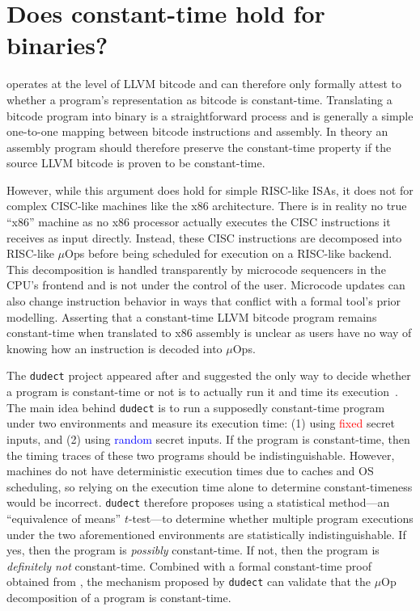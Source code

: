 \section{Does constant-time hold for binaries?}\label{sec:discussion}

\ctVerif operates at the level of LLVM bitcode and can therefore only formally attest to whether a program's
representation as bitcode is constant-time.
Translating a bitcode program into binary is a straightforward process and is generally a simple one-to-one mapping between bitcode instructions and assembly.
In theory an assembly program should therefore preserve the constant-time property if the source LLVM bitcode is proven to be constant-time.

However, while this argument does hold for simple RISC-like ISAs, it does not for complex CISC-like machines like the x86 architecture.
There is in reality no true ``x86'' machine as no x86 processor actually executes the CISC instructions it receives as input directly.
Instead, these CISC instructions are decomposed into RISC-like $\mu$Ops before being scheduled for execution on a RISC-like backend.
This decomposition is handled transparently by microcode sequencers in the CPU's frontend and is not under the control of the user.
Microcode updates can also change instruction behavior in ways that conflict with a formal tool's prior modelling.
Asserting that a constant-time LLVM bitcode program remains constant-time when translated to x86 assembly is unclear as users have no way of knowing how an instruction is decoded into $\mu$Ops.

The \texttt{dudect} project appeared after \ctVerif and suggested the only way to decide whether a program is constant-time or not is to actually run it and time its execution~\cite{dudect}.
The main idea behind \texttt{dudect} is to run a supposedly constant-time program under two environments and measure its execution time: (1) using \textcolor{red}{fixed} secret inputs, and (2) using \textcolor{blue}{random} secret inputs.
If the program is constant-time, then the timing traces of these two programs should be indistinguishable.
However, machines do not have deterministic execution times due to caches and OS scheduling, so relying on the execution time alone to determine constant-timeness would be incorrect.
\texttt{dudect} therefore proposes using a statistical method---an ``equivalence of means'' $t$-test---to determine whether multiple program executions under the two aforementioned environments are statistically indistinguishable.
If yes, then the program is \emph{possibly} constant-time. If not, then the program is \emph{definitely not} constant-time.
Combined with a formal constant-time proof obtained from \ctVerif, the mechanism proposed by \texttt{dudect} can validate that the $\mu$Op decomposition of a program is constant-time.

